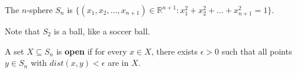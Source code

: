 
\begin{definition}
	The \( n \)-sphere \( S_n \) is \( \{(x_{1}, x_{2}, \ldots , x_{n+1})  \in \mathbb{R}^{n+1} : x_{1}^2+x_{2}^2+\ldots +x_{n+1}^2 = 1 \} \).
\end{definition}

Note that \( S_2 \) is a ball, like a soccer ball.

\begin{definition}
	A set \( X \subseteq S_n \) is \textbf{open} if for every \( x \in X \), there exists \( \epsilon >0 \) such that all points \( y \in S_n \) with \( dist(x, y) < \epsilon  \) are in \( X \).
\end{definition}
